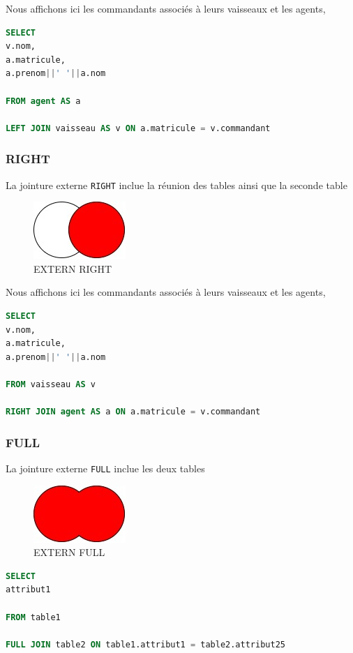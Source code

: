 Nous affichons ici les commandants associés à leurs vaisseaux et les agents,

\begin{lstlisting}[language=SQL]
SELECT 
v.nom, 
a.matricule, 
a.prenom||' '||a.nom

FROM agent AS a

LEFT JOIN vaisseau AS v ON a.matricule = v.commandant
\end{lstlisting}

\subsubsection{RIGHT}
La jointure externe \texttt{RIGHT} inclue la réunion des tables ainsi que la seconde table
\begin{figure}[H]
    \centering
    \includegraphics[width=0.25\linewidth]{image/RIGHT.jpg}
    \caption{EXTERN RIGHT}
    \label{fig:enter-label}
\end{figure}

Nous affichons ici les commandants associés à leurs vaisseaux et les agents,

\begin{lstlisting}[language=SQL]
SELECT 
v.nom, 
a.matricule, 
a.prenom||' '||a.nom

FROM vaisseau AS v

RIGHT JOIN agent AS a ON a.matricule = v.commandant
\end{lstlisting}

\subsubsection{FULL}
La jointure externe \texttt{FULL} inclue les deux tables
\begin{figure}[H]
    \centering
    \includegraphics[width=0.25\linewidth]{image/FULL.jpg}
    \caption{EXTERN FULL}
    \label{fig:enter-label}
\end{figure}

\begin{lstlisting}[language=SQL]
SELECT 
attribut1

FROM table1

FULL JOIN table2 ON table1.attribut1 = table2.attribut25
\end{lstlisting}

